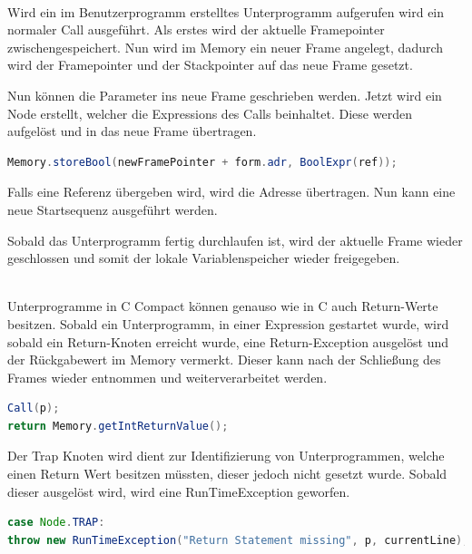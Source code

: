 \\
Wird ein im Benutzerprogramm erstelltes Unterprogramm aufgerufen wird ein normaler Call ausgeführt. Als erstes wird der aktuelle Framepointer zwischengespeichert. Nun wird im Memory ein neuer Frame angelegt, dadurch wird der Framepointer und der Stackpointer auf das neue Frame gesetzt.

Nun können die Parameter ins neue Frame geschrieben werden. Jetzt wird ein Node erstellt, welcher die Expressions des Calls beinhaltet. Diese werden aufgelöst und in das neue Frame übertragen. 
\begin{lstlisting}[language=JAVA]
Memory.storeBool(newFramePointer + form.adr, BoolExpr(ref));
\end{lstlisting}
Falls eine Referenz übergeben wird, wird die Adresse übertragen. Nun kann eine neue Startsequenz ausgeführt werden.

Sobald das Unterprogramm fertig durchlaufen ist, wird der aktuelle Frame wieder geschlossen und somit der lokale Variablenspeicher wieder freigegeben.

\\
Unterprogramme in C Compact können genauso wie in C auch Return-Werte besitzen. Sobald ein Unterprogramm, in einer Expression gestartet wurde, wird sobald ein Return-Knoten erreicht wurde, eine Return-Exception ausgelöst und der Rückgabewert im Memory vermerkt. Dieser kann nach der Schließung des Frames wieder entnommen und weiterverarbeitet werden.
\begin{lstlisting}[language=JAVA]
Call(p);
return Memory.getIntReturnValue();	
\end{lstlisting}

Der Trap Knoten wird dient zur Identifizierung von Unterprogrammen, welche einen Return Wert besitzen müssten, dieser jedoch nicht gesetzt wurde. Sobald dieser ausgelöst wird, wird eine RunTimeException geworfen.
\begin{lstlisting}[language=JAVA]
case Node.TRAP:
throw new RunTimeException("Return Statement missing", p, currentLine); 
\end{lstlisting}
